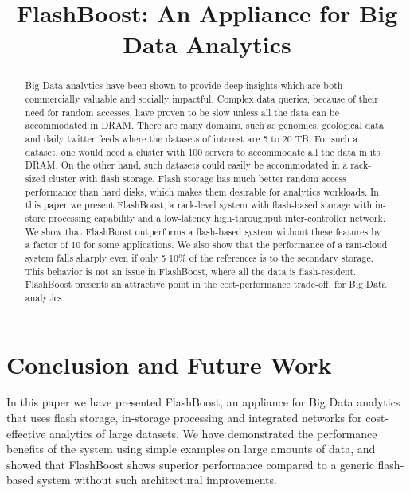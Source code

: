 \documentclass[pageno]{jpaper}
\begin{document}
\title{
FlashBoost: An Appliance for Big Data Analytics
}

\date{}
\maketitle


\begin{abstract}
Big Data analytics have been shown to provide deep insights which are both
commercially valuable and socially impactful. Complex data queries, because of
their need for random accesses, have proven to be slow unless all the data can
be accommodated in DRAM. There are many domains, such as genomics, geological
data and daily twitter feeds where the datasets of interest are 5 to 20 TB. For
such a dataset, one would need a cluster with 100 servers to accommodate all the
data in its DRAM. On the other hand, such datasets could easily be accommodated
in a rack-sized cluster with flash storage. Flash storage has much better random
access performance than hard disks, which makes them desirable for analytics
workloads. In this paper we present FlashBoost, a rack-level system with
flash-based storage with in-store processing capability and a low-latency
high-throughput inter-controller network.  We show that FlashBoost outperforms a
flash-based system without these features by a factor of 10 for some
applications. We also show that the performance of a ram-cloud system falls
sharply even if only 5 10\% of the references is to the secondary storage. This
behavior is not an issue in FlashBoost, where all the data is flash-resident.
FlashBoost presents an attractive point in the cost-performance trade-off, for
Big Data analytics. 
\end{abstract}



%









\section{Conclusion and Future Work}

In this paper we have presented FlashBoost, an appliance for Big Data analytics
that uses flash storage, in-storage processing and integrated networks for
cost-effective analytics of large datasets. We have demonstrated the performance
benefits of the system using simple examples on large amounts of data, and showed
that FlashBoost shows superior performance compared to a generic flash-based
system without such architectural improvements.
\end{document}
